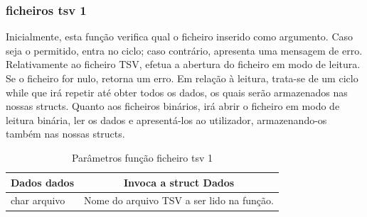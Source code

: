 \documentclass[a4wide]{report}
\begin{document}
\subsubsection{ficheiros tsv 1}
Inicialmente, esta função verifica qual o ficheiro inserido como argumento. Caso seja o permitido, entra no ciclo; caso contrário, apresenta uma mensagem de erro. Relativamente ao ficheiro TSV, efetua a abertura do ficheiro em modo de leitura. Se o ficheiro for nulo, retorna um erro. Em relação à leitura, trata-se de um ciclo while que irá repetir até obter todos os dados, os quais serão armazenados nas nossas structs. Quanto aos ficheiros binários, irá abrir o ficheiro em modo de leitura binária, ler os dados e apresentá-los ao utilizador, armazenando-os também nas nossas structs. 
\begin{table}[h]
    \centering
       \caption{Parâmetros função ficheiro tsv 1} 
    \begin{tabular}{|l|c|}\hline
         Dados dados&Invoca a struct Dados\\ \hline 
         char arquivo&Nome do arquivo TSV a ser lido na função.\\ \hline  
    \end{tabular}
\end{table}
\\
\end{document}
